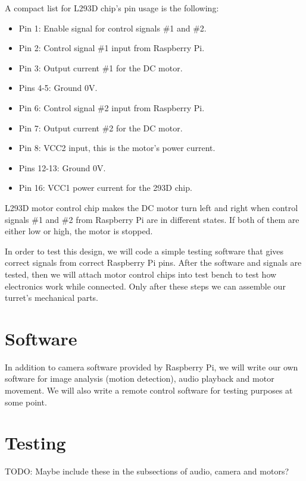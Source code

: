 \documentclass[english,11pt,twoside,a4paper]{article}
\begin{document}
A compact list for L293D chip's pin usage is the following:
\begin{itemize}
\item Pin 1: Enable signal for control signals \#1 and \#2.
\item Pin 2: Control signal \#1 input from Raspberry Pi.
\item Pin 3: Output current \#1 for the DC motor.
\item Pins 4-5: Ground 0V.
\item Pin 6: Control signal \#2 input from Raspberry Pi.
\item Pin 7: Output current \#2 for the DC motor.
\item Pin 8: VCC2 input, this is the motor's power current.
\item Pins 12-13: Ground 0V.
\item Pin 16: VCC1 power current for the 293D chip.
\end{itemize}

L293D motor control chip makes the DC motor turn left and right when control signals \#1 and \#2 from Raspberry Pi are in different states. If both of them are either low or high, the motor is stopped.

In order to test this design, we will code a simple testing software that gives correct signals from correct Raspberry Pi pins. After the software and signals are tested, then we will attach motor control chips into test bench to test how electronics work while connected. Only after these steps we can assemble our turret's mechanical parts.

\section{Software}
In addition to camera software provided by Raspberry Pi, we will write our own software for image analysis (motion detection), audio playback and motor movement. We will also write a remote control software for testing purposes at some point.

\section{Testing}
TODO: Maybe include these in the subsections of audio, camera and motors?
\end{document}
